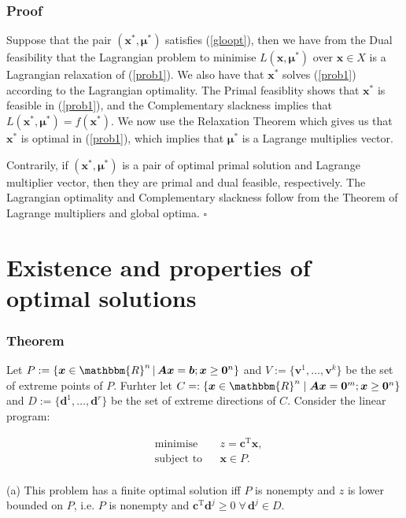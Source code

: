 \documentclass[12pt, a4paper]{article}
\begin{document}
\subsubsection*{Proof}
Suppose that the pair $(\bm{x}^*,\boldsymbol{\mu}^*)$ satisfies (\ref{gloopt}), then we have from the Dual feasibility that the Lagrangian problem to minimise $L(\bm{x},\boldsymbol{\mu}^*)$ over $\bm{x}\in X$ is a Lagrangian relaxation of (\ref{prob1}). We also have that $\bm{x}^*$ solves (\ref{prob1}) according to the Lagrangian optimality. The Primal feasiblity shows that $\bm{x}^*$ is feasible in (\ref{prob1}), and the Complementary slackness implies that $L(\bm{x}^*, \boldsymbol{\mu}^*) = f(\bm{x}^*)$. We now use the Relaxation Theorem which gives us that $\bm{x}^*$ is optimal in (\ref{prob1}), which implies that $\boldsymbol{\mu}^*$ is a Lagrange multiplies vector.

Contrarily, if $(\bm{x}^*, \boldsymbol{\mu}^*)$ is a pair of optimal primal solution and Lagrange multiplier vector, then they are primal and dual feasible, respectively. The Lagrangian optimality and Complementary slackness follow from the Theorem of Lagrange multipliers and global optima. $\square$

\section{Existence and properties of optimal solutions}
\subsubsection*{Theorem}
Let $P := \{ \bm{x}\in \mathbbm{R}^n \,|\, \bm{Ax}=\bm{b}; \bm{x}\geq\bm{0}^n \}$ and $V := \{\bm{v}^1,\dots,\bm{v}^k\}$ be the set of extreme points of $P$. Furhter let $C=:\{ \bm{x}\in \mathbbm{R}^n \; | \; \bm{Ax}=\bm{0}^m; \bm{x}\geq \bm{0}^n\}$ and $D:=\{ \bm{d}^1,\dots,\bm{d}^r\}$ be the set of extreme directions of $C$. Consider the linear program:

\begin{equation}
\label{exist}
\begin{aligned}
& {\text{minimise}}
& & z=\bm{c}^{\text{T}}\bm{x}, \\
& \text{subject to}
& & \bm{x}\in P. \\
\end{aligned}
\end{equation}

(a) This problem has a finite optimal solution iff $P$ is nonempty and $z$ is lower bounded on $P$, i.e. $P$ is nonempty and $\bm{c}^{\text{T}}\bm{d}^j\geq 0\; \forall \, \bm{d}^j\in D$. 
\end{document}
